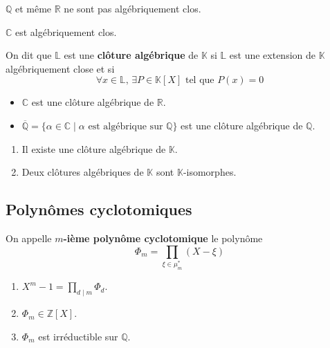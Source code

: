   \begin{cexample}
    $\mathbb{Q}$ et même $\mathbb{R}$ ne sont pas algébriquement clos.
  \end{cexample}

  \begin{theorem}
    $\mathbb{C}$ est algébriquement clos.
  \end{theorem}

  \begin{definition}
    On dit que $\mathbb{L}$ est une \textbf{clôture algébrique} de $\mathbb{K}$ si $\mathbb{L}$ est une extension de $\mathbb{K}$ algébriquement close et si
    \[ \forall x \in \mathbb{L}, \, \exists P \in \mathbb{K}[X] \text{ tel que } P(x) = 0 \]
  \end{definition}

  \begin{example}
    \begin{itemize}
      \item $\mathbb{C}$ est une clôture algébrique de $\mathbb{R}$.
      \item $\overline{\mathbb{Q}} = \{ \alpha \in \mathbb{C} \mid \alpha \text{ est algébrique sur } \mathbb{Q} \}$ est une clôture algébrique de $\mathbb{Q}$.
    \end{itemize}
  \end{example}

  \begin{theorem}[Steinitz]
    \begin{enumerate}[label=(\roman*)]
      \item Il existe une clôture algébrique de $\mathbb{K}$.
      \item Deux clôtures algébriques de $\mathbb{K}$ sont $\mathbb{K}$-isomorphes.
    \end{enumerate}
  \end{theorem}

  \subsection{Polynômes cyclotomiques}

  \begin{definition}
    On appelle \textbf{$m$-ième polynôme cyclotomique} le polynôme
    \[ \Phi_m = \prod_{\xi \in \mu_m^*} (X - \xi) \]
  \end{definition}

  \begin{theorem}
    \begin{enumerate}[label=(\roman*)]
      \item $X^m - 1 = \prod_{d \mid m} \Phi_d$.
      \item $\Phi_m \in \mathbb{Z}[X]$.
      \item $\Phi_m$ est irréductible sur $\mathbb{Q}$.
    \end{enumerate}
  \end{theorem}

